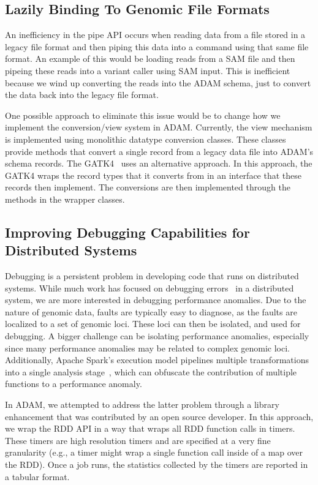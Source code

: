 \documentclass[phd]{ucbthesis}
\begin{document}
\subsection{Lazily Binding To Genomic File Formats}
\label{sec:lazy-bind}

An inefficiency in the {pipe} API occurs when reading data from a file
stored in a legacy file format and then piping this data into a command using
that same file format. An example of this would be loading reads from a SAM file
and then {pipe}ing these reads into a variant caller using SAM input.
This is inefficient because we wind up converting the reads into the
{ADAM} schema, just to convert the data back into the legacy file format.

One possible approach to eliminate this issue would be to change how we
implement the conversion/view system in {ADAM}. Currently, the view
mechanism is implemented using monolithic datatype conversion classes. These
classes provide methods that convert a single record from a legacy data file
into {ADAM}'s schema records. The {GATK4}~\cite{gatk4} uses an
alternative approach. In this approach, the {GATK4} wraps the record
types that it converts from in an interface that these records then implement.
The conversions are then implemented through the methods in the wrapper classes.

\subsection{Improving Debugging Capabilities for Distributed Systems}
\label{sec:improving-debug}

Debugging is a persistent problem in developing code that runs on distributed
systems. While much work has focused on debugging errors~\cite{alvaro15, zhang17}
in a distributed system, we are more interested in debugging performance
anomalies. Due to the nature of genomic data, faults are typically easy to
diagnose, as the faults are localized to a set of genomic loci. These loci can
then be isolated, and used for debugging. A bigger challenge can be isolating
performance anomalies, especially since many performance anomalies may be
related to complex genomic loci. Additionally, {Apache Spark}'s execution
model pipelines multiple transformations into a single analysis
stage~\cite{zaharia12}, which can obfuscate the contribution of multiple
functions to a performance anomaly.

In {ADAM}, we attempted to address the latter problem through a library
enhancement that was contributed by an open source developer. In this approach,
we wrap the RDD API in a way that wraps all RDD function calls in timers. These
timers are high resolution timers and are specified at a very fine granularity
(e.g., a timer might wrap a single function call inside of a map over the RDD).
Once a job runs, the statistics collected by the timers are reported in a
tabular format.
\end{document}
